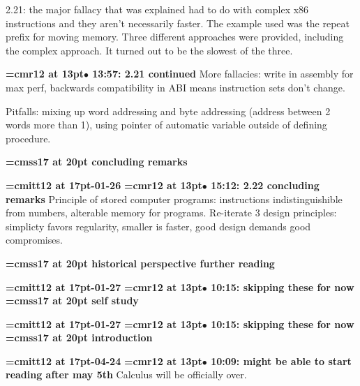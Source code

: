 2.21: the major fallacy that was explained had to do with complex x86 instructions and they aren't necessarily faster. The example used was the repeat prefix for moving memory. Three different approaches were provided, including the complex approach. It turned out to be the slowest of the three.
\par

{\smallskip\noindent\bf\font\titlefont=cmr12 at 13pt\titlefont $\bullet$ 13:57: 2.21 continued}\smallskip
More fallacies: write in assembly for max perf, backwards compatibility in ABI means instruction sets don't change.
\par

Pitfalls: mixing up word addressing and byte addressing (address between 2 words more than 1), using pointer of automatic variable outside of defining procedure.
\par

{\medskip\noindent\bf\font\titlefont=cmss17 at 20pt concluding remarks}\medskip

{\medskip\noindent\bf\font\titlefont=cmitt12 at 17pt-01-26}\medskip
{\smallskip\noindent\bf\font\titlefont=cmr12 at 13pt\titlefont $\bullet$ 15:12: 2.22 concluding remarks}\smallskip
Principle of stored computer programs: instructions indistinguishible from numbers, alterable memory for programs. Re-iterate 3 design principles: simplicty favors regularity, smaller is faster, good design demands good compromises.
\par

{\medskip\noindent\bf\font\titlefont=cmss17 at 20pt historical perspective further reading}\medskip

{\medskip\noindent\bf\font\titlefont=cmitt12 at 17pt-01-27}\medskip
{\smallskip\noindent\bf\font\titlefont=cmr12 at 13pt\titlefont $\bullet$ 10:15: skipping these for now}\smallskip
{}
{\medskip\noindent\bf\font\titlefont=cmss17 at 20pt self study}\medskip

{\medskip\noindent\bf\font\titlefont=cmitt12 at 17pt-01-27}\medskip
{\smallskip\noindent\bf\font\titlefont=cmr12 at 13pt\titlefont $\bullet$ 10:15: skipping these for now}\smallskip
{}
{\medskip\noindent\bf\font\titlefont=cmss17 at 20pt introduction}\medskip

{\medskip\noindent\bf\font\titlefont=cmitt12 at 17pt-04-24}\medskip
{\smallskip\noindent\bf\font\titlefont=cmr12 at 13pt\titlefont $\bullet$ 10:09: might be able to start reading after may 5th}\smallskip
Calculus will be officially over.
\par

\bye
